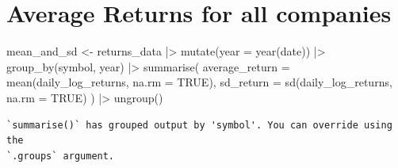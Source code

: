 \documentclass[
  letterpaper,
  DIV=11,
  numbers=noendperiod]{scrreprt}
\newenvironment{Shaded}{\begin{snugshade}}{\end{snugshade}}
\newcommand{\AttributeTok}[1]{\textcolor[rgb]{0.40,0.45,0.13}{#1}}
\newcommand{\ConstantTok}[1]{\textcolor[rgb]{0.56,0.35,0.01}{#1}}
\newcommand{\FunctionTok}[1]{\textcolor[rgb]{0.28,0.35,0.67}{#1}}
\newcommand{\NormalTok}[1]{\textcolor[rgb]{0.00,0.23,0.31}{#1}}
\newcommand{\OtherTok}[1]{\textcolor[rgb]{0.00,0.23,0.31}{#1}}
\newcommand{\SpecialCharTok}[1]{\textcolor[rgb]{0.37,0.37,0.37}{#1}}
\theoremstyle{definition}
\theoremstyle{remark}
\begin{document}
\section{Average Returns for all
companies}\label{average-returns-for-all-companies}

\begin{Shaded}
\begin{Highlighting}[]
\NormalTok{mean\_and\_sd }\OtherTok{\textless{}{-}} 
\NormalTok{  returns\_data }\SpecialCharTok{|\textgreater{}} 
  \FunctionTok{mutate}\NormalTok{(}\AttributeTok{year =} \FunctionTok{year}\NormalTok{(date)) }\SpecialCharTok{|\textgreater{}} 
  \FunctionTok{group\_by}\NormalTok{(symbol, year) }\SpecialCharTok{|\textgreater{}} 
  \FunctionTok{summarise}\NormalTok{(}
    \AttributeTok{average\_return =} \FunctionTok{mean}\NormalTok{(daily\_log\_returns, }\AttributeTok{na.rm =} \ConstantTok{TRUE}\NormalTok{), }
    \AttributeTok{sd\_return =} \FunctionTok{sd}\NormalTok{(daily\_log\_returns, }\AttributeTok{na.rm =} \ConstantTok{TRUE}\NormalTok{)}
\NormalTok{    ) }\SpecialCharTok{|\textgreater{}} 
  \FunctionTok{ungroup}\NormalTok{()}
\end{Highlighting}
\end{Shaded}

\begin{verbatim}
`summarise()` has grouped output by 'symbol'. You can override using the
`.groups` argument.
\end{verbatim}
\end{document}
